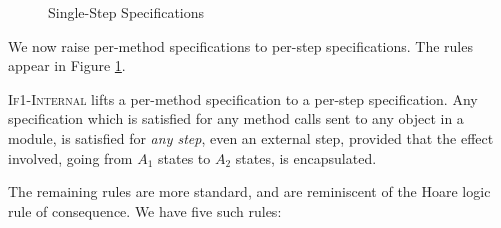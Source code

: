 \begin{figure}[thb]
\caption{Single-Step \Nec Specifications}
\label{f:only-if-single}
\end{figure}

We now raise per-method \Nec specifications 
to per-step \Nec specifications. 
The rules appear in Figure \ref{f:only-if-single}.

\textsc{If1-Internal} 
 lifts a per-method \Nec specification to a per-step \Nec specification.
Any \Nec specification which is satisfied for any method
calls sent to any object in a module, is satisfied for \emph{any step}, even
an external step, provided that the effect involved, \ie going from $A_1$ states to
$A_2$ states, is encapsulated.

 The remaining rules are more standard, and are reminiscent of the Hoare logic rule of consequence.
 We have five such rules:
 
